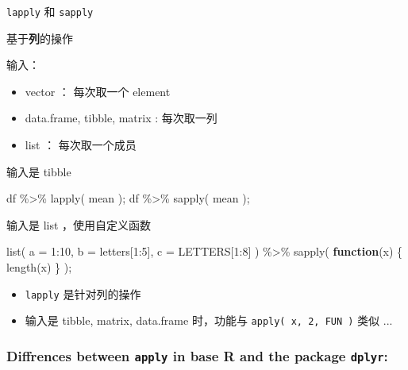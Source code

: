 \documentclass[
]{article}
\newenvironment{Shaded}{}{}
\newcommand{\AttributeTok}[1]{\textcolor[rgb]{0.49,0.56,0.16}{#1}}
\newcommand{\ControlFlowTok}[1]{\textcolor[rgb]{0.00,0.44,0.13}{\textbf{#1}}}
\newcommand{\DecValTok}[1]{\textcolor[rgb]{0.25,0.63,0.44}{#1}}
\newcommand{\FunctionTok}[1]{\textcolor[rgb]{0.02,0.16,0.49}{#1}}
\newcommand{\NormalTok}[1]{#1}
\newcommand{\SpecialCharTok}[1]{\textcolor[rgb]{0.25,0.44,0.63}{#1}}
\begin{document}
\texttt{lapply} 和 \texttt{sapply}

基于\textbf{列}的操作

输入：

\begin{itemize}
\item
  vector ： 每次取一个 element
\item
  data.frame, tibble, matrix : 每次取一列
\item
  list ： 每次取一个成员
\end{itemize}

输入是 tibble

\begin{Shaded}
\begin{Highlighting}[]
\NormalTok{df }\SpecialCharTok{\%\textgreater{}\%} \FunctionTok{lapply}\NormalTok{( mean );}
\NormalTok{df }\SpecialCharTok{\%\textgreater{}\%} \FunctionTok{sapply}\NormalTok{( mean );}
\end{Highlighting}
\end{Shaded}

输入是 list ，使用自定义函数

\begin{Shaded}
\begin{Highlighting}[]
\FunctionTok{list}\NormalTok{( }\AttributeTok{a =} \DecValTok{1}\SpecialCharTok{:}\DecValTok{10}\NormalTok{, }\AttributeTok{b =}\NormalTok{ letters[}\DecValTok{1}\SpecialCharTok{:}\DecValTok{5}\NormalTok{], }\AttributeTok{c =}\NormalTok{ LETTERS[}\DecValTok{1}\SpecialCharTok{:}\DecValTok{8}\NormalTok{] ) }\SpecialCharTok{\%\textgreater{}\%} 
  \FunctionTok{sapply}\NormalTok{( }\ControlFlowTok{function}\NormalTok{(x) \{ }\FunctionTok{length}\NormalTok{(x) \} );}
\end{Highlighting}
\end{Shaded}

\begin{itemize}
\item
  \texttt{lapply} 是针对列的操作
\item
  输入是 tibble, matrix, data.frame 时，功能与
  \texttt{apply(\ x,\ 2,\ FUN\ )} 类似 ...
\end{itemize}

\hypertarget{diffrences-between-apply-in-base-r-and-the-package-dplyr}{%
\subsubsection{\texorpdfstring{Diffrences between \texttt{apply} in base
R and the package
\texttt{dplyr}:}{Diffrences between apply in base R and the package dplyr:}}\label{diffrences-between-apply-in-base-r-and-the-package-dplyr}}
\end{document}
